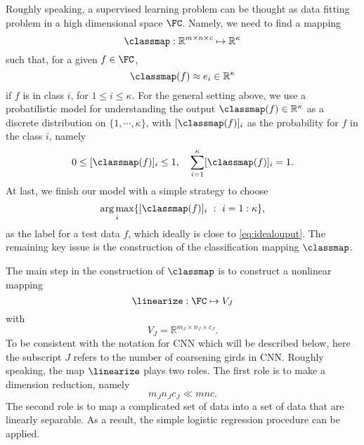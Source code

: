 Roughly speaking, a supervised learning problem can be thought as data fitting
problem in a high dimensional space $\FC$.
Namely, we need to find a mapping
$$
\classmap:  \mathbb R^{m\times n\times c}\mapsto \mathbb R^\kappa
$$
such that, for a given $f\in  \FC$, 
\begin{equation}\label{eq:idealouput}
\classmap(f)\approx e_i\in \mathbb R^\kappa
\end{equation}
if $f$ is in class $i$, for $1\le i\le \kappa$. 
For the general setting above, we use a probatilistic model for understanding the
output $\classmap(f) \in \mathbb{R}^{\kappa}$ as a discrete 
distribution on $\{1, \cdots,\kappa\}$, with $[\classmap (f)]_i$ as the probability
for $f$ in the class $i$, namely
\begin{equation}
\label{distrib}
0 \le [\classmap(f)]_i \le 1,\quad 
\sum_{i=1}^\kappa  [\classmap(f)]_i=1. 
\end{equation}
At last, we finish our model with a simple strategy to choose
\begin{equation}\label{eq:maxchoose}
\mathop{\arg\max}_{i}\{[\classmap(f)]_i~:~ i = 1:\kappa\},
\end{equation}
as the label for a test data $f$, which ideally is close to
\eqref{eq:idealouput}.  The remaining key issue is the construction of
the classification mapping $\classmap$.


The main step in the construction of $\classmap$ is to 
construct a nonlinear mapping
\begin{equation}
\label{linearize}
\linearize: \FC \mapsto V_J
\end{equation}
with 
\begin{equation}
\label{VJ}
V_J = \mathbb R^{m_J\times n_J\times c_J}. 
\end{equation}
To be consistent with the notation for CNN which will be described below,
here the subscript $J$ refers to the number of 
coarsening girds in CNN. 
Roughly speaking, the map $\linearize$ plays two roles.  The first role
is to make a dimension reduction, namely
$$
m_Jn_Jc_J\ll  mnc.
$$
The second role is to map a complicated set of data into a set of data
that are linearly separable. As a result, the simple logistic regression 
procedure can be applied.

